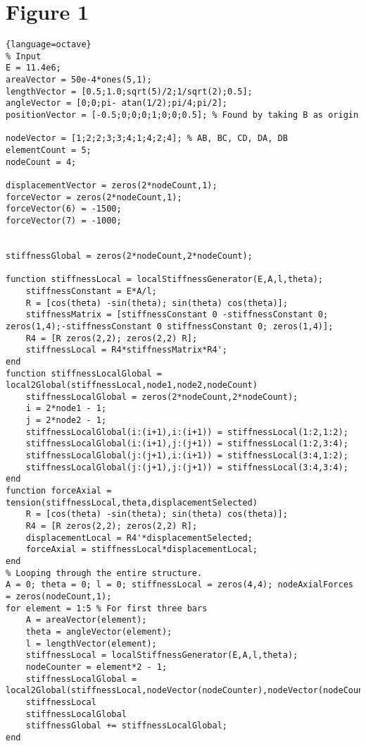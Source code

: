 \documentclass{article}
\begin{document}
\section{Figure 1} 
\begin{lstlisting}{language=octave}
% Input
E = 11.4e6;
areaVector = 50e-4*ones(5,1);
lengthVector = [0.5;1.0;sqrt(5)/2;1/sqrt(2);0.5];
angleVector = [0;0;pi- atan(1/2);pi/4;pi/2];
positionVector = [-0.5;0;0;0;1;0;0;0.5]; % Found by taking B as origin

nodeVector = [1;2;2;3;3;4;1;4;2;4]; % AB, BC, CD, DA, DB
elementCount = 5;
nodeCount = 4;

displacementVector = zeros(2*nodeCount,1);
forceVector = zeros(2*nodeCount,1);
forceVector(6) = -1500;
forceVector(7) = -1000;


stiffnessGlobal = zeros(2*nodeCount,2*nodeCount);

function stiffnessLocal = localStiffnessGenerator(E,A,l,theta);
    stiffnessConstant = E*A/l;
    R = [cos(theta) -sin(theta); sin(theta) cos(theta)];
    stiffnessMatrix = [stiffnessConstant 0 -stiffnessConstant 0; zeros(1,4);-stiffnessConstant 0 stiffnessConstant 0; zeros(1,4)];
    R4 = [R zeros(2,2); zeros(2,2) R];
    stiffnessLocal = R4*stiffnessMatrix*R4';
end
function stiffnessLocalGlobal = local2Global(stiffnessLocal,node1,node2,nodeCount)
    stiffnessLocalGlobal = zeros(2*nodeCount,2*nodeCount);
    i = 2*node1 - 1;
    j = 2*node2 - 1;
    stiffnessLocalGlobal(i:(i+1),i:(i+1)) = stiffnessLocal(1:2,1:2);
    stiffnessLocalGlobal(i:(i+1),j:(j+1)) = stiffnessLocal(1:2,3:4);
    stiffnessLocalGlobal(j:(j+1),i:(i+1)) = stiffnessLocal(3:4,1:2);
    stiffnessLocalGlobal(j:(j+1),j:(j+1)) = stiffnessLocal(3:4,3:4);
end
function forceAxial = tension(stiffnessLocal,theta,displacementSelected)
    R = [cos(theta) -sin(theta); sin(theta) cos(theta)];
    R4 = [R zeros(2,2); zeros(2,2) R];
    displacementLocal = R4'*displacementSelected;
    forceAxial = stiffnessLocal*displacementLocal;
end
% Looping through the entire structure.
A = 0; theta = 0; l = 0; stiffnessLocal = zeros(4,4); nodeAxialForces = zeros(nodeCount,1);
for element = 1:5 % For first three bars
    A = areaVector(element);
    theta = angleVector(element);
    l = lengthVector(element);
    stiffnessLocal = localStiffnessGenerator(E,A,l,theta);
    nodeCounter = element*2 - 1;
    stiffnessLocalGlobal = local2Global(stiffnessLocal,nodeVector(nodeCounter),nodeVector(nodeCounter+1),nodeCount);
    stiffnessLocal
    stiffnessLocalGlobal
    stiffnessGlobal += stiffnessLocalGlobal;
end


\end{lstlisting}
\end{document}
